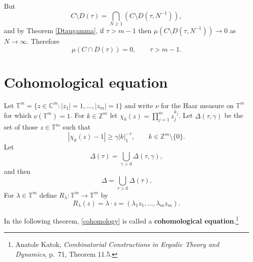 \documentclass{article}
\theoremstyle{definition}
\begin{document}
But
\[
C \setminus D(\tau) =  \bigcap_{N \geq 1} (C \setminus D(\tau,N^{-1})),
\]
and by Theorem \ref{Dtaugamma}, if $\tau>m-1$ then $\mu(C \setminus D(\tau,N^{-1})) \to 0$ as $N \to \infty$. 
Therefore 
\[
\mu(C \cap D(\tau)) = 0,\qquad \tau>m-1.
\]



\section{Cohomological equation}
Let $\mathbb{T}^m = \{z \in \mathbb{C}^m: |z_1|=1,\ldots,|z_m|=1\}$
and write $\nu$ for the Haar measure on $\mathbb{T}^m$ for which $\nu(\mathbb{T}^m)=1$.
For $k \in \mathbb{Z}^m$ let $\chi_k(z) = \prod_{j=1}^m z_j^{k_j}$. 
Let
$\Delta(\tau,\gamma)$ be the set of those
$z \in \mathbb{T}^m$ such that
\[
|\chi_k(z)-1| \geq \gamma |k|_1^{-\tau},\qquad k \in \mathbb{Z}^m \setminus \{0\}.
\]
Let 
\[
\Delta(\tau) = \bigcup_{\gamma>0} \Delta(\tau,\gamma),
\]
and then
\[
\Delta = \bigcup_{\tau>0} \Delta(\tau).
\]
For $\lambda \in \mathbb{T}^m$ define $R_\lambda:\mathbb{T}^m \to \mathbb{T}^m$ by
\[
R_\lambda(z) = \lambda \cdot z= (\lambda_1 z_1,\ldots,\lambda_m z_m).
\]


In the following theorem, \eqref{cohomology} is called a \textbf{cohomological equation}.\footnote{Anatole Katok, {\em Combinatorial Constructions in Ergodic Theory and Dynamics}, p.~71, Theorem 11.5.}
\end{document}
